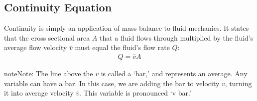 \documentclass[letterpaper,10pt,english]{sphinxmanual}
\begin{document}
\subsection{Continuity Equation}
\label{\detokenize{Review/Review_Fluid_Mechanics:continuity-equation}}\label{\detokenize{Review/Review_Fluid_Mechanics:heading-continuity-equation}}
Continuity is simply an application of mass balance to fluid mechanics. It states that the cross sectional area \(A\) that a fluid flows through multiplied by the fluid’s average flow velocity \(\bar v\) must equal the fluid’s flow rate \(Q\):
\begin{equation}\label{equation:Review/Review_Fluid_Mechanics:continuity_equation}
\begin{split}  Q = \bar v A\end{split}
\end{equation}
\begin{sphinxadmonition}{note}{Note:}
The line above the \(v\) is called a ‘bar,’ and represents an average. Any variable can have a bar. In this case, we are adding the bar to velocity \(v\), turning it into average velocity \(\bar v\). This variable is pronounced ‘v bar.’
\end{sphinxadmonition}
\end{document}
